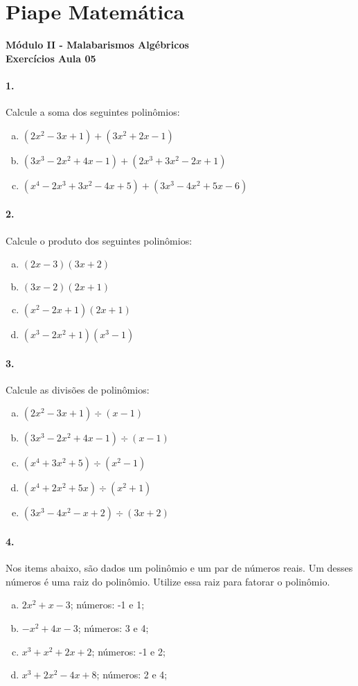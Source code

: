 \documentclass[a4paper,12pt]{article}
\begin{document}
 
  
\section*{Piape Matemática} 
\textbf{Módulo II - Malabarismos Algébricos}\\
\textbf{Exercícios Aula 05}         
\begin{multicols}{2}
\paragraph*{1.} Calcule a soma dos seguintes polinômios:
\begin{enumerate}[a)]
\item $(2x^2 - 3x + 1) + (3x^2 + 2x - 1)$
\item $(3x^3 - 2x^2 + 4x - 1) + (2x^3 + 3x^2 - 2x + 1)$
\item $(x^4 - 2x^3 + 3x^2 - 4x + 5) + ( 3x^3 - 4x^2 + 5x - 6)$ 
\end{enumerate}
\paragraph*{2.} Calcule o produto dos seguintes polinômios:
\begin{enumerate}[a)]
\item $(2x - 3)(3x + 2)$
\item $(3x - 2)(2x + 1)$
\item $(x^2 - 2x + 1)(2x + 1)$
\item $(x^3 - 2x^2 + 1)(x^3 - 1)$
\end{enumerate}

\paragraph*{3.} Calcule as divisões de polinômios:
\begin{enumerate}[a)]
\item $(2x^2 - 3x + 1) \div (x - 1)$
\item $(3x^3 - 2x^2 + 4x - 1) \div (x - 1)$
\item $(x^4  + 3x^2   + 5) \div (x^2 - 1)$
\item $(x^4  + 2x^2   + 5x) \div (x^2 + 1)$
\item $(3x^3-4x^2-x+2)\div(3x+2)$
\end{enumerate}

\paragraph*{4.} Nos items abaixo, são dados um polinômio e um par de números reais. Um desses números é uma raiz do polinômio. Utilize essa raiz para fatorar o polinômio.
\begin{enumerate}[a)]
\item $2x^2 + x - 3$; números: -1 e 1;
\item $-x^2 + 4x - 3$; números: 3 e 4; 
\item $x^3 + x^2 + 2x + 2$; números: -1 e 2;
\item $x^3 + 2x^2 -4x + 8$; números: 2 e 4;
\end{enumerate}


\end{multicols}
\end{document}
